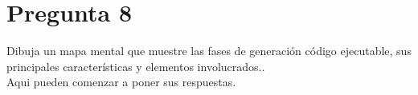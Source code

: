 \newpage
\section*{Pregunta 8}
\Large 
Dibuja un mapa mental que muestre las fases de generación código ejecutable, sus principales características y elementos involucrados..\\
\newline
\large
Aqui pueden comenzar a poner sus respuestas.